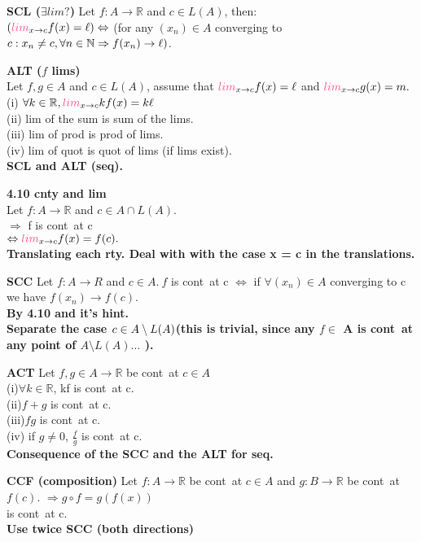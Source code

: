 \documentclass[10pt,landscape,a4paper]{article}
\def\line{

  \noindent{\color{mygray} \rule{\linewidth}{0.005mm}}

}
\def\R{\mathbb{R}}
\def\N{\mathbb{N}}
\def\lim{\textcolor{frenchrose}{lim}}
\def\cont{\textcolor{brickred}{cont}}
\newcommand\thm[1]{\line\textcolor{darklavender}{\bf#1}}
\newcommand\hint[1]{\textcolor{trolleygrey}{\bf#1}}
\newcommand\LIMc{\lim_{x\to c}}
\begin{document}
\begin{multicols}{8}
\thm{SCL \hint{($\exists lim ?$)}} Let $f: A \to \R$ and $ c \in L(A)$, then:\\
$(\LIMc f(x) = \ell) \Leftrightarrow$ (for any $(x_n) \in A$ converging to $c: x_n \neq c,\\ \forall n \in \N \Rightarrow f(x_n) \to \ell)$.

\thm{ALT ($f$ \lim s)} \\Let $f, g \in A$ and $c \in L(A)$, assume that $\LIMc f(x) = \ell$ and $\LIMc g(x) = m.$\\ 
(i) $\forall k \in \R, \LIMc k f(x) = k \ell$\\
(ii) lim of the sum is sum of the lims.\\
(iii) lim of prod is prod of lims.\\
(iv) lim of quot is quot of lims (if lims exist).\\\hint{SCL and ALT (seq).}


\thm{4.10 cnty and \lim}\\ Let $f: A \to \R$ and $c \in A \cap L(A)$.\\$\Rightarrow$ f is \cont\ at c \\$\Leftrightarrow \LIMc f(x) = f(c).$\\
\hint{Translating each rty. Deal with with the case x = c in the translations.}

\thm{SCC} Let $ f: A \to R$ and $ c \in A. \ f$ is \cont\ at c $\Leftrightarrow$ if $\forall (x_n) \in A$ converging to c we have $ f(x_n) \to f(c).$  
\\\hint{By 4.10 and it's hint.\\Separate the case $c \in A \setminus L(A)\\$(this is trivial, since any $f \in$ A is \cont\ at any point of $A \setminus L(A) \hdots$ ).}

\thm{ACT} Let $f, g \in A \to \R$ be \cont\ at  $c \in A$\\
(i)$\forall k \in \R$, kf is \cont\ at c.\\
(ii)$f + g$ is \cont\ at c.\\
(iii)$fg$ is \cont\ at c.\\
(iv) if $g\neq0$, $\frac{f}{g}$ is \cont\ at c.\\
\hint{Consequence of the SCC and the ALT for seq.}

\thm{CCF (composition)} Let $f:A \to \R$ be \cont\ at  $c \in A$ and $g: B \to \R$ be \cont\ at  $f(c).$
$\Rightarrow g \circ f = g(f(x))$\\ is \cont\ at c.
\\\hint{Use twice SCC (both directions)}


\end{multicols}
\end{document}
